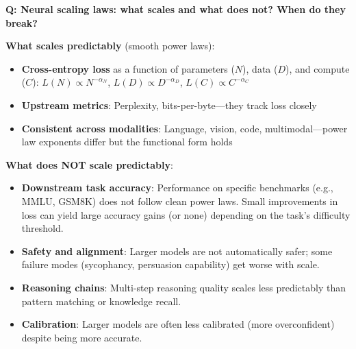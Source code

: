 \begin{interviewq}
\textbf{Q: Neural scaling laws: what scales and what does not? When do they break?}

 \quad {} \quad \badgefreq{\freqmed}

\stronganswer
\textbf{What scales predictably} (smooth power laws):
\begin{itemize}
    \item \textbf{Cross-entropy loss} as a function of parameters ($N$), data ($D$), and compute ($C$): $L(N) \propto N^{-\alpha_N}$, $L(D) \propto D^{-\alpha_D}$, $L(C) \propto C^{-\alpha_C}$
    \item \textbf{Upstream metrics}: Perplexity, bits-per-byte---they track loss closely
    \item \textbf{Consistent across modalities}: Language, vision, code, multimodal---power law exponents differ but the functional form holds
\end{itemize}

\textbf{What does NOT scale predictably}:
\begin{itemize}
    \item \textbf{Downstream task accuracy}: Performance on specific benchmarks (e.g., MMLU, GSM8K) does not follow clean power laws. Small improvements in loss can yield large accuracy gains (or none) depending on the task's difficulty threshold.
    \item \textbf{Safety and alignment}: Larger models are not automatically safer; some failure modes (sycophancy, persuasion capability) get worse with scale.
    \item \textbf{Reasoning chains}: Multi-step reasoning quality scales less predictably than pattern matching or knowledge recall.
    \item \textbf{Calibration}: Larger models are often less calibrated (more overconfident) despite being more accurate.
\end{itemize}


\end{interviewq}
